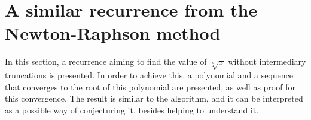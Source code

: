 \section*{A similar recurrence from the Newton-Raphson method}

In this section, a recurrence aiming to find
the value of $\sqrt[n]{x}$ without intermediary truncations
is presented.
In order to achieve this, a polynomial
and a sequence that converges to the root of this polynomial
are presented, as well as proof for this convergence.
The result is similar to the algorithm,
and it can be interpreted as a possible way of conjecturing it,
besides helping to understand it.
